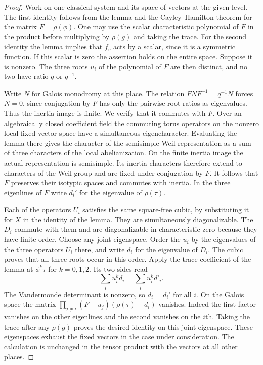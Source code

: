 \documentclass[a4paper,11pt]{article}
\theoremstyle{definition}
\theoremstyle{remark}
\numberwithin{equation}{section}
\begin{document}
\begin{proof}
Work on one classical system and its space of vectors at the
given level. The first identity follows from the lemma and
the Cayley--Hamilton theorem for the matrix \(F=\rho(\phi)\).
One may use the scalar characteristic polynomial of \(F\)
in the product before multiplying by \(\rho(g)\) and taking
the trace. For the second identity the lemma implies that
\(f_v\) acts by a scalar, since it is a symmetric function.
If this scalar is zero the assertion holds on the entire
space. Suppose it is nonzero. The three roots \(u_i\) of the
polynomial of \(F\) are then distinct, and no two have ratio
\(q\) or \(q^{-1}\).

Write \(N\) for Galois monodromy at this place. The relation
\(FNF^{-1}=q^{\pm1}N\) forces \(N=0\), since conjugation by
\(F\) has only the pairwise root ratios as eigenvalues. Thus
the inertia image is finite. We verify that it commutes with
\(F\). Over an algebraically closed coefficient field the
commuting torus operators on the nonzero local fixed-vector
space have a simultaneous eigencharacter. Evaluating the
lemma there gives the character of the semisimple Weil
representation as a sum of three characters of the local
abelianization. On the finite inertia image the actual
representation is semisimple. Its inertia characters therefore
extend to characters of the Weil group and are fixed under
conjugation by \(F\). It follows that \(F\) preserves their
isotypic spaces and commutes with inertia. In the three
eigenlines of \(F\) write \(d_i'\) for the eigenvalue of
\(\rho(\tau)\).

Each of the operators \(U_i\) satisfies the same square-free
cubic, by substituting it for \(X\) in the identity of the
lemma. They are simultaneously diagonalizable. The \(D_i\)
commute with them and are diagonalizable in characteristic
zero because they have finite order. Choose any joint
eigenspace. Order the \(u_i\) by the eigenvalues of the three
operators \(U_i\) there, and write \(d_i\) for the eigenvalue
of \(D_i\). The cubic proves that all three roots occur in
this order. Apply the trace coefficient of the lemma at
\(\phi^k\tau\) for \(k=0,1,2\). Its two sides read
\[
                  \sum_i u_i^k d_i=\sum_i u_i^k d'_i .
\]
The Vandermonde determinant is nonzero, so \(d_i=d_i'\) for
all \(i\). On the Galois space the matrix
\(\prod_{j\ne i}(F-u_j)(\rho(\tau)-d_i)\) vanishes. Indeed
the first factor vanishes on the other eigenlines and the
second vanishes on the \(i\)th. Taking the trace after any
\(\rho(g)\) proves the desired identity on this joint
eigenspace. These eigenspaces exhaust the fixed vectors in
the case under consideration. The calculation is unchanged
in the tensor product with the vectors at all other places.


\end{proof}
\end{document}
